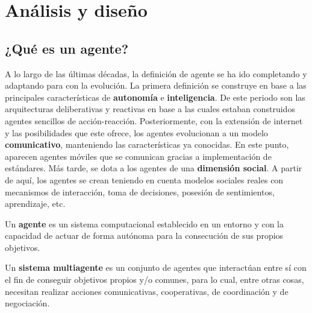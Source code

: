 \chapter{Análisis y diseño}
    \label{chap:four}

\renewcommand{\labelitemi}{$\bullet$}
\renewcommand{\labelitemii}{$\circ$}
\renewcommand{\labelitemiii}{$\Rightarrow$}

\section{¿Qué es un agente?}
A lo largo de las últimas décadas, la definición de agente se ha ido completando y adaptando para con la evolución. 
\newline La primera definición se construye en base a las principales características de \textbf{autonomía} e \textbf{inteligencia}. De este periodo son las arquitecturas deliberativas y reactivas en base a las cuales estaban construidos agentes sencillos de acción-reacción.
\newline Posteriormente, con la extensión de internet y las posibilidades que este ofrece, los agentes evolucionan a un modelo \textbf{comunicativo}, manteniendo las características ya conocidas. En este punto, aparecen agentes móviles que se comunican gracias a implementación de estándares.
\newline Más tarde, se dota a los agentes de una \textbf{dimensión social}. A partir de aquí, los agentes se crean teniendo en cuenta modelos sociales reales con mecanismos de interacción, toma de decisiones, posesión de sentimientos, aprendizaje, etc.

Un \textbf{agente} es un sistema computacional establecido en un entorno y con la capacidad de actuar de forma autónoma para la consecución de sus propios objetivos.

Un \textbf{sistema multiagente} es un conjunto de agentes que interactúan entre sí con el fin de conseguir objetivos propios y/o comunes, para lo cual, entre otras cosas, necesitan realizar acciones comunicativas, cooperativas, de coordinación y de negociación.
\newline \cite{dba2122, intelligent_agents}

\newpage
